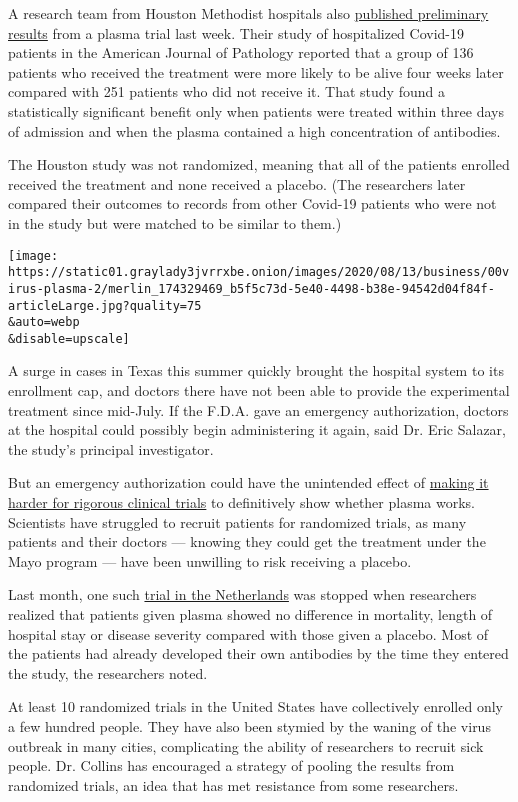 A research team from Houston Methodist hospitals also
\href{https://ajp.amjpathol.org/article/S0002-9440(20)30370-9/fulltext}{published
preliminary results} from a plasma trial last week. Their study of
hospitalized Covid-19 patients in the American Journal of Pathology
reported that a group of 136 patients who received the treatment were
more likely to be alive four weeks later compared with 251 patients who
did not receive it. That study found a statistically significant benefit
only when patients were treated within three days of admission and when
the plasma contained a high concentration of antibodies.

The Houston study was not randomized, meaning that all of the patients
enrolled received the treatment and none received a placebo. (The
researchers later compared their outcomes to records from other Covid-19
patients who were not in the study but were matched to be similar to
them.)

\texttt{[image: https://static01.graylady3jvrrxbe.onion/images/2020/08/13/business/00virus-plasma-2/merlin\_174329469\_b5f5c73d-5e40-4498-b38e-94542d04f84f-articleLarge.jpg?quality=75\\\&auto=webp\\\&disable=upscale]}

A surge in cases in Texas this summer quickly brought the hospital
system to its enrollment cap, and doctors there have not been able to
provide the experimental treatment since mid-July. If the F.D.A. gave an
emergency authorization, doctors at the hospital could possibly begin
administering it again, said Dr. Eric Salazar, the study's principal
investigator.

But an emergency authorization could have the unintended effect of
\href{https://www.nytimes3xbfgragh.onion/2020/08/04/health/trump-plasma.html}{making
it harder for rigorous clinical trials} to definitively show whether
plasma works. Scientists have struggled to recruit patients for
randomized trials, as many patients and their doctors --- knowing they
could get the treatment under the Mayo program --- have been unwilling
to risk receiving a placebo.

Last month, one such
\href{https://www.medrxiv.org/content/10.1101/2020.07.01.20139857v1}{trial
in the Netherlands} was stopped when researchers realized that patients
given plasma showed no difference in mortality, length of hospital stay
or disease severity compared with those given a placebo. Most of the
patients had already developed their own antibodies by the time they
entered the study, the researchers noted.

At least 10 randomized trials in the United States have collectively
enrolled only a few hundred people. They have also been stymied by the
waning of the virus outbreak in many cities, complicating the ability of
researchers to recruit sick people. Dr. Collins has encouraged a
strategy of pooling the results from randomized trials, an idea that has
met resistance from some researchers.

